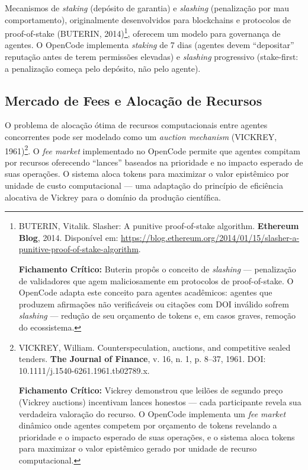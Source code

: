 Mecanismos de \textit{staking} (depósito de garantia) e \textit{slashing} (penalização por mau comportamento), originalmente desenvolvidos para blockchains e protocolos de proof-of-stake (BUTERIN, 2014)\footnote{
  BUTERIN, Vitalik. Slasher: A punitive proof-of-stake algorithm. \textbf{Ethereum Blog}, 2014. Disponível em: \url{https://blog.ethereum.org/2014/01/15/slasher-a-punitive-proof-of-stake-algorithm}.

  \textbf{Fichamento Crítico:} Buterin propôs o conceito de \textit{slashing} --- penalização de validadores que agem maliciosamente em protocolos de proof-of-stake. O OpenCode adapta este conceito para agentes acadêmicos: agentes que produzem afirmações não verificáveis ou citações com DOI inválido sofrem \textit{slashing} --- redução de seu orçamento de tokens e, em casos graves, remoção do ecossistema.
}, oferecem um modelo para governança de agentes. O OpenCode implementa \textit{staking} de 7 dias (agentes devem ``depositar'' reputação antes de terem permissões elevadas) e \textit{slashing} progressivo (stake-first: a penalização começa pelo depósito, não pelo agente).

\subsection{Mercado de Fees e Alocação de Recursos}

O problema de alocação ótima de recursos computacionais entre agentes concorrentes pode ser modelado como um \textit{auction mechanism} (VICKREY, 1961)\footnote{
  VICKREY, William. Counterspeculation, auctions, and competitive sealed tenders. \textbf{The Journal of Finance}, v. 16, n. 1, p. 8--37, 1961. DOI: 10.1111/j.1540-6261.1961.tb02789.x.

  \textbf{Fichamento Crítico:} Vickrey demonstrou que leilões de segundo preço (Vickrey auctions) incentivam lances honestos --- cada participante revela sua verdadeira valoração do recurso. O OpenCode implementa um \textit{fee market} dinâmico onde agentes competem por orçamento de tokens revelando a prioridade e o impacto esperado de suas operações, e o sistema aloca tokens para maximizar o valor epistêmico gerado por unidade de recurso computacional.
}. O \textit{fee market} implementado no OpenCode permite que agentes compitam por recursos oferecendo ``lances'' baseados na prioridade e no impacto esperado de suas operações. O sistema aloca tokens para maximizar o valor epistêmico por unidade de custo computacional --- uma adaptação do princípio de eficiência alocativa de Vickrey para o domínio da produção científica.

